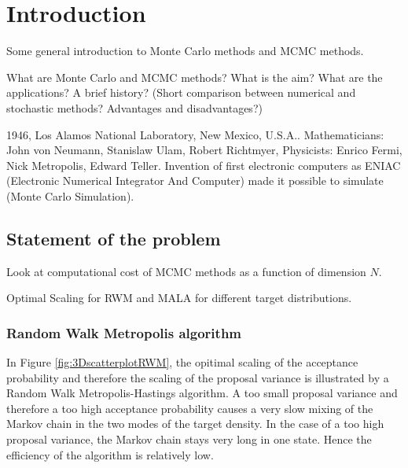 \section{Introduction}
\label{sec:introduction}


Some general introduction to Monte Carlo methods and MCMC methods.

What are Monte Carlo and MCMC methods? What is the aim? What are the applications? A brief history? (Short comparison between numerical and stochastic methods? Advantages and disadvantages?)
\newline

1946, Los Alamos National Laboratory, New Mexico, U.S.A.. Mathematicians: John von Neumann, Stanislaw Ulam, Robert Richtmyer, Physicists: Enrico Fermi, Nick Metropolis, Edward Teller.
Invention of first electronic computers as ENIAC (Electronic Numerical Integrator And Computer) made it possible to simulate (Monte Carlo Simulation).

\subsection*{Statement of the problem}

Look at computational cost of MCMC methods as a function of dimension $ N $.

Optimal Scaling for RWM and MALA for different target distributions.

\subsubsection*{Random Walk Metropolis algorithm}

In Figure \ref{fig:3DscatterplotRWM}, the opitimal scaling of the acceptance probability and therefore the scaling of the proposal variance is illustrated by a Random Walk Metropolis-Hastings algorithm. A too small proposal variance and therefore a too high acceptance probability causes a very slow mixing of the Markov chain in the two modes of the target density. In the case of a too high proposal variance, the Markov chain stays very long in one state. Hence the efficiency of the algorithm is relatively low.


